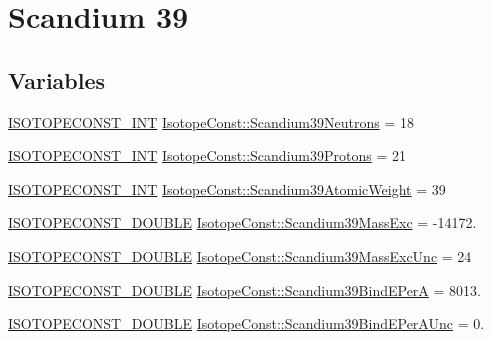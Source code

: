 \hypertarget{group___isotope_const-_scandium-_sc39}{}\section{Scandium 39}
\label{group___isotope_const-_scandium-_sc39}
\subsection*{Variables}
\begin{DoxyCompactItemize}
\item 
\mbox{\hyperlink{group___isotope_const-_macros_ga5f18360b3e99483a35c32d789e62621c}{I\+S\+O\+T\+O\+P\+E\+C\+O\+N\+S\+T\+\_\+\+I\+NT}} \mbox{\hyperlink{group___isotope_const-_scandium-_sc39_ga6c54ba41152b03f3d46ef8cc97fbd40f}{Isotope\+Const\+::\+Scandium39\+Neutrons}} = 18
\item 
\mbox{\hyperlink{group___isotope_const-_macros_ga5f18360b3e99483a35c32d789e62621c}{I\+S\+O\+T\+O\+P\+E\+C\+O\+N\+S\+T\+\_\+\+I\+NT}} \mbox{\hyperlink{group___isotope_const-_scandium-_sc39_gadb48a2d14c26c7903f99f9d8c5263e45}{Isotope\+Const\+::\+Scandium39\+Protons}} = 21
\item 
\mbox{\hyperlink{group___isotope_const-_macros_ga5f18360b3e99483a35c32d789e62621c}{I\+S\+O\+T\+O\+P\+E\+C\+O\+N\+S\+T\+\_\+\+I\+NT}} \mbox{\hyperlink{group___isotope_const-_scandium-_sc39_ga1a14739dab5cda751009252ebcb75053}{Isotope\+Const\+::\+Scandium39\+Atomic\+Weight}} = 39
\item 
\mbox{\hyperlink{group___isotope_const-_macros_ga8f45a7272ce02c0b4c65c44636ed719a}{I\+S\+O\+T\+O\+P\+E\+C\+O\+N\+S\+T\+\_\+\+D\+O\+U\+B\+LE}} \mbox{\hyperlink{group___isotope_const-_scandium-_sc39_ga675a0b6350197a25745c7815ee98ffde}{Isotope\+Const\+::\+Scandium39\+Mass\+Exc}} = -\/14172.
\item 
\mbox{\hyperlink{group___isotope_const-_macros_ga8f45a7272ce02c0b4c65c44636ed719a}{I\+S\+O\+T\+O\+P\+E\+C\+O\+N\+S\+T\+\_\+\+D\+O\+U\+B\+LE}} \mbox{\hyperlink{group___isotope_const-_scandium-_sc39_ga7af237a899f78de157c70b89870f8816}{Isotope\+Const\+::\+Scandium39\+Mass\+Exc\+Unc}} = 24
\item 
\mbox{\hyperlink{group___isotope_const-_macros_ga8f45a7272ce02c0b4c65c44636ed719a}{I\+S\+O\+T\+O\+P\+E\+C\+O\+N\+S\+T\+\_\+\+D\+O\+U\+B\+LE}} \mbox{\hyperlink{group___isotope_const-_scandium-_sc39_ga9102232e5181f4a1d7bee38b4c1cfabf}{Isotope\+Const\+::\+Scandium39\+Bind\+E\+PerA}} = 8013.
\item 
\mbox{\hyperlink{group___isotope_const-_macros_ga8f45a7272ce02c0b4c65c44636ed719a}{I\+S\+O\+T\+O\+P\+E\+C\+O\+N\+S\+T\+\_\+\+D\+O\+U\+B\+LE}} \mbox{\hyperlink{group___isotope_const-_scandium-_sc39_ga1effdbc801a7780f5ec6aa1ef79c85b4}{Isotope\+Const\+::\+Scandium39\+Bind\+E\+Per\+A\+Unc}} = 0.

\end{DoxyCompactItemize}
